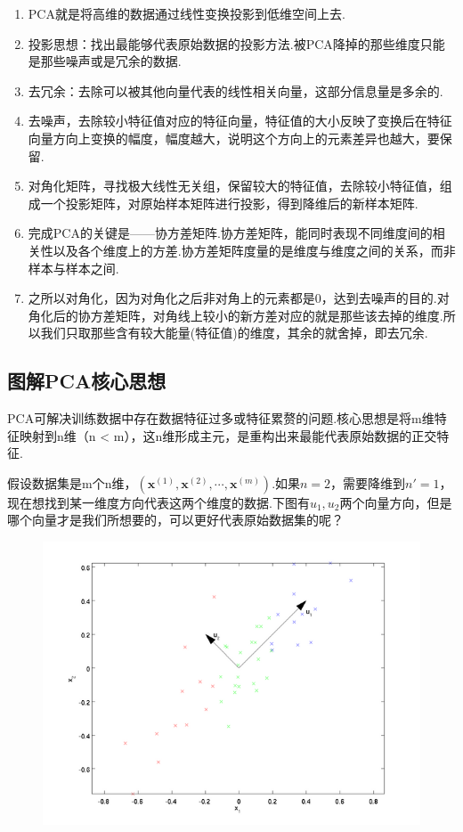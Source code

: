 \begin{enumerate}
\def\labelenumi{\arabic{enumi}.}
\item
  PCA就是将高维的数据通过线性变换投影到低维空间上去.
\item
  投影思想：找出最能够代表原始数据的投影方法.被PCA降掉的那些维度只能是那些噪声或是冗余的数据.
\item
  去冗余：去除可以被其他向量代表的线性相关向量，这部分信息量是多余的.
\item
  去噪声，去除较小特征值对应的特征向量，特征值的大小反映了变换后在特征向量方向上变换的幅度，幅度越大，说明这个方向上的元素差异也越大，要保留.
\item
  对角化矩阵，寻找极大线性无关组，保留较大的特征值，去除较小特征值，组成一个投影矩阵，对原始样本矩阵进行投影，得到降维后的新样本矩阵.
\item
  完成PCA的关键是------协方差矩阵.协方差矩阵，能同时表现不同维度间的相关性以及各个维度上的方差.协方差矩阵度量的是维度与维度之间的关系，而非样本与样本之间.
\item
  之所以对角化，因为对角化之后非对角上的元素都是0，达到去噪声的目的.对角化后的协方差矩阵，对角线上较小的新方差对应的就是那些该去掉的维度.所以我们只取那些含有较大能量(特征值)的维度，其余的就舍掉，即去冗余.
\end{enumerate}

\subsection{图解PCA核心思想}\label{ux56feux89e3pcaux6838ux5fc3ux601dux60f3}

​
PCA可解决训练数据中存在数据特征过多或特征累赘的问题.核心思想是将m维特征映射到n维（n
\textless{} m），这n维形成主元，是重构出来最能代表原始数据的正交特征.

​
假设数据集是m个n维，$(\boldsymbol x^{(1)}, \boldsymbol x^{(2)}, \cdots, \boldsymbol x^{(m)})$.如果$n=2$，需要降维到$n'=1$，现在想找到某一维度方向代表这两个维度的数据.下图有$u_1, u_2$两个向量方向，但是哪个向量才是我们所想要的，可以更好代表原始数据集的呢？

\begin{figure}
\centering
\includegraphics{./img/ch2/2.34/1.png}
\caption{}
\end{figure}

